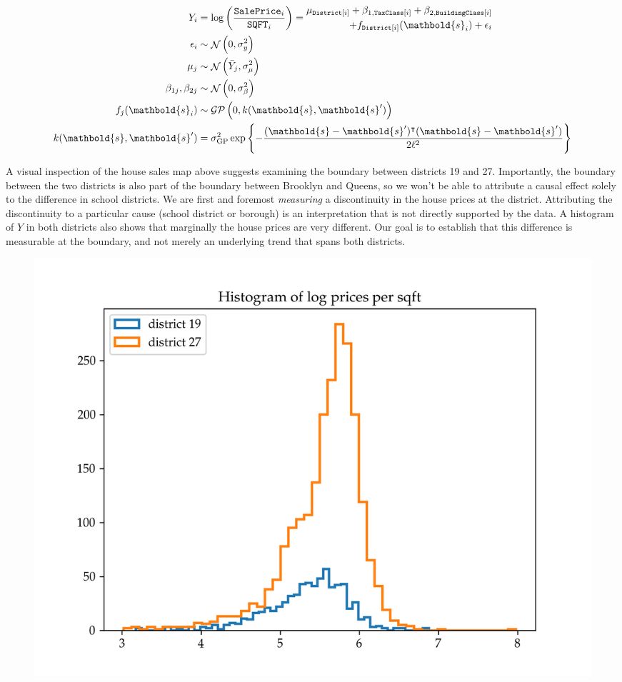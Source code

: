 \documentclass[letter]{article}
\makeatletter
\def\maxwidth{\ifdim\Gin@nat@width>\linewidth\linewidth
\else\Gin@nat@width\fi}
\let\Oldincludegraphics\includegraphics
\renewcommand{\includegraphics}[1]{\Oldincludegraphics[width=.8\maxwidth]{#1}}
\DeclareMathOperator{\normal}{\mathcal{N}}
\newcommand{\saleprice}{\mathtt{SalePrice}}
\newcommand{\sqft}{\mathtt{SQFT}}
\newcommand{\tax}{\mathtt{TaxClass}}
\newcommand{\building}{\mathtt{BuildingClass}}
\newcommand{\district}{\mathtt{District}}
\newcommand{\gp}{\mathcal{GP}}
\newcommand{\trans}{^{\intercal}}
\newcommand{\sigmaf}{\sigma_{\mathrm{GP}}}
\newcommand{\svec}{\mathbold{s}}
\makeatother
\begin{document}
\begin{equation}
\begin{split}
    Y_i &= \log\del{ \frac{\saleprice_i}{\sqft_i}} =
        \begin{split}
             \mu_{\district\sbr{i}} + \beta_{1,\tax\sbr{i}} + \beta_{2,\building\sbr{i}} \\
                  + f_{\district\sbr{i}}(\svec_i) + \epsilon_i \\
         \end{split}
    \\
    \epsilon_i &\sim \normal\del{0, \sigma_y^2} \\
    \mu_{j} &\sim \normal\del{\bar{Y}_j, \sigma_\mu^2} \\
    \beta_{1j},\beta_{2j} &\sim \normal\del{0, \sigma_\beta^2} \\
    f_j(\svec_i) &\sim \gp\del{0, k(\svec, \svec')} \\
    k(\svec, \svec') &= \sigmaf^2 \exp\cbr{ - \frac{(\svec-\svec')\trans(\svec-\svec')}{2\ell^2}}
\end{split}
\end{equation}

A visual inspection of the house sales map above suggests examining the boundary between districts 19 and 27. Importantly, the boundary between the two districts is also part of the boundary between Brooklyn and Queens, so we won't be able to attribute a causal effect solely to the difference in school districts. We are first and foremost \emph{measuring} a discontinuity in the house prices at the district. Attributing the discontinuity to a particular cause (school district or borough) is an interpretation that is not directly supported by the data.
A histogram of \(Y\) in both districts also shows that marginally the house prices are very different.
Our goal is to establish that this difference is measurable at the boundary, and not merely an underlying trend that spans both districts.

\begin{figure}
\centering
\includegraphics{NYC/NYC_plots/sales_histogram_19-27.png}
\caption{}
\end{figure}
    
\end{document}
